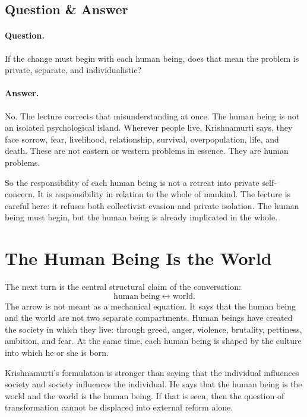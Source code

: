 \subsection{Question \& Answer}

\paragraph{Question.}
If the change must begin with each human being, does that mean the problem is private, separate, and individualistic?

\paragraph{Answer.}
No. The lecture corrects that misunderstanding at once. The human being is not an isolated psychological island. Wherever people live, Krishnamurti says, they face sorrow, fear, livelihood, relationship, survival, overpopulation, life, and death. These are not eastern or western problems in essence. They are human problems.

So the responsibility of each human being is not a retreat into private self-concern. It is responsibility in relation to the whole of mankind. The lecture is careful here: it refuses both collectivist evasion and private isolation. The human being must begin, but the human being is already implicated in the whole.

\section{The Human Being Is the World}

The next turn is the central structural claim of the conversation:
\begin{equation}
\mathrm{human\ being}
\leftrightarrow
\mathrm{world}.
\end{equation}
The arrow is not meant as a mechanical equation. It says that the human being and the world are not two separate compartments. Human beings have created the society in which they live: through greed, anger, violence, brutality, pettiness, ambition, and fear. At the same time, each human being is shaped by the culture into which he or she is born.

Krishnamurti's formulation is stronger than saying that the individual influences society and society influences the individual. He says that the human being is the world and the world is the human being. If that is seen, then the question of transformation cannot be displaced into external reform alone.

